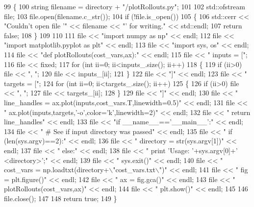 \begin{DoxyCode}
99   \{
100     \textcolor{keywordtype}{string} filename = directory + \textcolor{stringliteral}{"/plotRollouts.py"};
101     
102     std::ofstream file;
103     file.open(filename.c\_str());
104     \textcolor{keywordflow}{if} (!file.is\_open())
105     \{
106       std::cerr << \textcolor{stringliteral}{"Couldn't open file '"} << filename << \textcolor{stringliteral}{"' for writing."} << std::endl;
107       \textcolor{keywordflow}{return} \textcolor{keyword}{false};
108     \}
109     
110     
111     file << \textcolor{stringliteral}{"import numpy as np"} << endl;
112     file << \textcolor{stringliteral}{"import matplotlib.pyplot as plt"} << endl;
113     file << \textcolor{stringliteral}{"import sys, os"} << endl;
114     file << \textcolor{stringliteral}{"def plotRollouts(cost\_vars,ax):"} << endl;
115     file << \textcolor{stringliteral}{"    inputs = ["};
116     file << fixed;
117     \textcolor{keywordflow}{for} (\textcolor{keywordtype}{int} ii=0; ii<inputs\_.size(); ii++)
118     \{
119       \textcolor{keywordflow}{if} (ii>0) file << \textcolor{stringliteral}{", "};
120       file << inputs\_[ii];
121     \}
122     file << \textcolor{stringliteral}{"]"} << endl;
123     file << \textcolor{stringliteral}{"    targets = ["};
124     \textcolor{keywordflow}{for} (\textcolor{keywordtype}{int} ii=0; ii<targets\_.size(); ii++)
125     \{
126       \textcolor{keywordflow}{if} (ii>0) file << \textcolor{stringliteral}{", "};
127       file << targets\_[ii];
128     \}
129     file << \textcolor{stringliteral}{"]"} << endl;
130     file << \textcolor{stringliteral}{"    line\_handles = ax.plot(inputs,cost\_vars.T,linewidth=0.5)"} << endl;
131     file << \textcolor{stringliteral}{"    ax.plot(inputs,targets,'-o',color='k',linewidth=2)"} << endl;
132     file << \textcolor{stringliteral}{"    return line\_handles"} << endl;
133     file << \textcolor{stringliteral}{"if \_\_name\_\_=='\_\_main\_\_':"} << endl;
134     file << \textcolor{stringliteral}{"    # See if input directory was passed"} << endl;
135     file << \textcolor{stringliteral}{"    if (len(sys.argv)==2):"} << endl;
136     file << \textcolor{stringliteral}{"      directory = str(sys.argv[1])"} << endl;
137     file << \textcolor{stringliteral}{"    else:"} << endl;
138     file << \textcolor{stringliteral}{"      print 'Usage: '+sys.argv[0]+' <directory>';"} << endl;
139     file << \textcolor{stringliteral}{"      sys.exit()"} << endl;
140     file << \textcolor{stringliteral}{"    cost\_vars = np.loadtxt(directory+\(\backslash\)"cost\_vars.txt\(\backslash\)")"} << endl;
141     file << \textcolor{stringliteral}{"    fig = plt.figure()"} << endl;
142     file << \textcolor{stringliteral}{"    ax = fig.gca()"} << endl;
143     file << \textcolor{stringliteral}{"    plotRollouts(cost\_vars,ax)"} << endl;
144     file << \textcolor{stringliteral}{"    plt.show()"} << endl;
145     
146     file.close();
147     
148     \textcolor{keywordflow}{return} \textcolor{keyword}{true};
149   \}
\end{DoxyCode}
